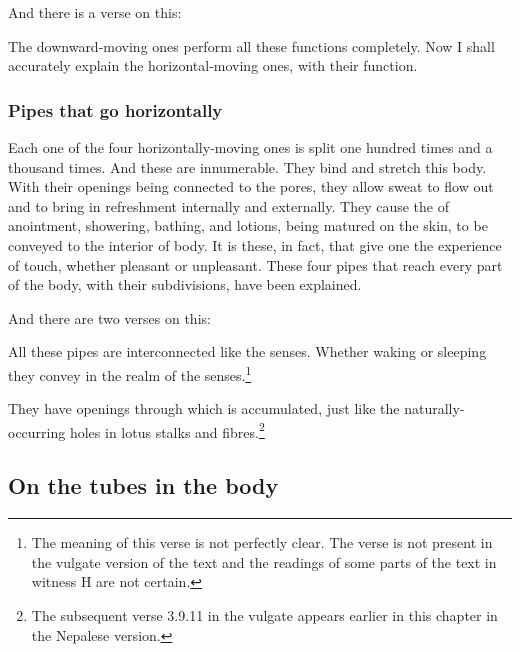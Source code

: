 \begin{translation}
\item[8]

And there is a verse on this:
\begin{sloka}
   The downward-moving ones perform all these functions completely.  Now I shall accurately explain the horizontal-moving ones, with their function. 
\end{sloka}

\subsubsection{Pipes that go horizontally}
\item [9]

Each one of the four horizontally-moving ones is split one hundred times
and a thousand times. And these are innumerable. They bind and stretch
this  body.  With their openings being
connected to the pores, they allow sweat to flow out and
 to bring in refreshment  internally and externally. They
cause the  of anointment, showering, bathing, and
lotions, being matured on the skin, to be conveyed to the interior of body.
It is these, in fact, that give one the experience of touch, whether pleasant or 
unpleasant.
These four pipes that reach every part of the body, with their subdivisions, have 
been explained. 


\item[9.add]

And there are two verses on this:
\begin{sloka}
    All these pipes are interconnected like the senses. Whether waking
or sleeping they convey in the realm of the senses.\footnote{The
    meaning of this verse is not perfectly clear.  The verse is not
    present in the vulgate version of the text and the readings of
    some parts of the text in witness H are not certain.}
\end{sloka}


\item[10]

\begin{sloka}
They have openings through which  is accumulated, just like
the naturally-occurring holes in lotus stalks and fibres.\footnote{The 
subsequent verse 3.9.11 in the vulgate appears earlier in this chapter in the 
Nepalese 
version.} 
\end{sloka}


\subsection{On the tubes in the body}
\item[12]


\end{translation}
